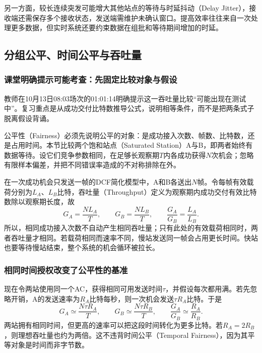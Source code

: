 另一方面，较长连续突发可能增大其他站点的等待与时延抖动（Delay Jitter），接收端还需保存多个接收状态，发送端需维护未确认窗口。提高效率往往来自一次处理更多数据，但实时系统还要约束数据在组批和等待期间增加的时延。

\subsection{分组公平、时间公平与吞吐量}

\subsubsection{课堂明确提示可能考查：先固定比较对象与假设}

教师在10月13日08:03场次的01:01:14明确提示这一吞吐量比较“可能出现在测试中”。复习重点是从成功交付比特数推导公式，说明相等条件，而不是把两条式子脱离假设背诵。

公平性（Fairness）必须先说明公平的对象：是成功接入次数、帧数、比特数，还是占用时间。本节比较两个饱和站点（Saturated Station）A与B，即两者始终有数据等待。设它们竞争参数相同，在足够长观察期$T$内各成功获得$N$次机会；忽略有限样本偏差，并把不同错误率造成的不对称排除在外。

在一次成功机会只发送一帧的DCF简化模型中，A和B各送出$N$帧。令每帧有效载荷分别为$L_A$、$L_B$比特，吞吐量（Throughput）定义为观察期内成功交付有效比特数除以观察期长度，故
\begin{equation}
G_A=\frac{NL_A}{T},\qquad G_B=\frac{NL_B}{T},\qquad
\frac{G_A}{G_B}=\frac{L_A}{L_B}.
\end{equation}
所以，相同成功接入次数不自动产生相同吞吐量；只有此处的有效载荷相同时，两者吞吐量才相同。若载荷相同而速率不同，慢站发送同一帧会占用更长时间。快站也要等待慢站结束，整个系统的机会循环被拉长。

\subsubsection{相同时间授权改变了公平性的基准}

现在令两站使用同一个AC，获得相同可用发送时间$\tau$，并假设每次都用满。若先忽略开销，A的发送速率为$R_A$比特每秒，则一次机会发送$\tau R_A$比特。于是
\begin{equation}
G_A\simeq\frac{N\tau R_A}{T},\qquad
G_B\simeq\frac{N\tau R_B}{T},\qquad
\frac{G_A}{G_B}\simeq\frac{R_A}{R_B}.
\end{equation}
两站拥有相同时间，但更高的速率可以把这段时间转化为更多比特。若$R_A=2R_B$，则理想吞吐量也约为两倍。这不违背时间公平（Temporal Fairness），因为其平等对象是时间而非字节数。

